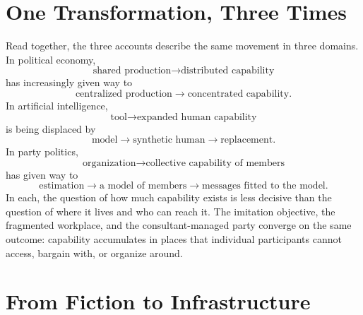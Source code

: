 \documentclass[11pt]{article}
\begin{document}
\section{One Transformation, Three Times}

Read together, the three accounts describe the same movement in three domains. In political economy,
\[
\text{shared production} \longrightarrow \text{distributed capability}
\]
has increasingly given way to
\[
\text{centralized production} \longrightarrow \text{concentrated capability}.
\]
In artificial intelligence,
\[
\text{tool} \longrightarrow \text{expanded human capability}
\]
is being displaced by
\[
\text{model} \longrightarrow \text{synthetic human} \longrightarrow \text{replacement}.
\]
In party politics,
\[
\text{organization} \longrightarrow \text{collective capability of members}
\]
has given way to
\[
\text{estimation} \longrightarrow \text{a model of members} \longrightarrow \text{messages fitted to the model}.
\]
In each, the question of how much capability exists is less decisive than the question of where it lives and who can reach it. The imitation objective, the fragmented workplace, and the consultant-managed party converge on the same outcome: capability accumulates in places that individual participants cannot access, bargain with, or organize around.

\section{From Fiction to Infrastructure}
\end{document}
